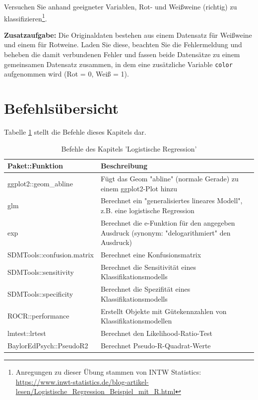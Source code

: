 \documentclass[12pt,ngerman,]{book}
\let\rmarkdownfootnote\footnote%
\def\footnote{\protect\rmarkdownfootnote}
\begin{document}
Versuchen Sie anhand geeigneter Variablen, Rot- und Weißweine (richtig)
zu klassifizieren\footnote{Anregungen zu dieser Übung stammen von INTW
  Statistics:
  \url{https://www.inwt-statistics.de/blog-artikel-lesen/Logistische_Regression_Beispiel_mit_R.html}}.

\textbf{Zusatzaufgabe:} Die Originaldaten bestehen aus einem Datensatz
für Weißweine und einem für Rotweine. Laden Sie diese, beachten Sie die
Fehlermeldung und beheben die damit verbundenen Fehler und fassen beide
Datensätze zu einem gemeinsamen Datensatz zusammen, in dem eine
zusätzliche Variable \texttt{color} aufgenommen wird (Rot = 0, Weiß =
1).

\section{Befehlsübersicht}\label{befehlsubersicht-8}

Tabelle \ref{tab:befehle-logist-regression} stellt die Befehle dieses
Kapitels dar.

\begin{table}

\caption{\label{tab:befehle-logist-regression}Befehle des Kapitels 'Logistische Regression'}
\centering
\begin{tabular}[t]{l|l}
\hline
Paket::Funktion & Beschreibung\\
\hline
ggplot2::geom\_abline & Fügt das Geom "abline" (normale Gerade) zu einem ggplot2-Plot hinzu\\
\hline
glm & Berechnet ein "generalisiertes lineares Modell", z.B. eine logistische Regression\\
\hline
exp & Berechnet die e-Funktion für den angegeben Ausdruck (synonym: "delogarithmiert" den Ausdruck)\\
\hline
SDMTools::confusion.matrix & Berechnet eine Konfusionsmatrix\\
\hline
SDMTools::sensitivity & Berechnet die Sensitivität eines Klassifikationsmodells\\
\hline
SDMTools::specificity & Berechnet die Spezifität eines Klassifikationsmodells\\
\hline
ROCR::performance & Erstellt Objekte mit Gütekennzahlen von Klassifikationsmodellen\\
\hline
lmtest::lrtest & Berechnet den Likelihood-Ratio-Test\\
\hline
BaylorEdPsych::PseudoR2 & Berechnet Pseudo-R-Quadrat-Werte\\
\hline
\end{tabular}
\end{table}
\end{document}
